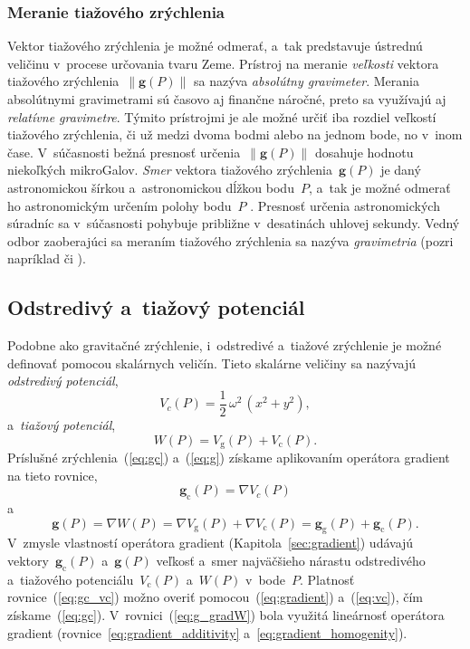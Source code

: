 \documentclass[a4paper, 12pt]{book}
\newcommand{\gidx}{\mathrm g}
\newcommand{\cidx}{\mathrm c}
\let\vec\mathbf
\begin{document}
\subsubsection{Meranie tiažového zrýchlenia}
\label{sec:gravity_measurements}

Vektor tiažového zrýchlenia je možné odmerať, a~tak predstavuje ústrednú 
veličinu v~procese určovania tvaru Zeme.  Prístroj na meranie \emph{veľkosti} 
vektora tiažového zrýchlenia~$\| \vec g(P) \|$ sa nazýva \emph{absolútny 
gravimeter}.  Merania absolútnymi gravimetrami sú časovo aj finančne náročné, 
preto sa využívajú aj \emph{relatívne gravimetre}.  Týmito prístrojmi je ale 
možné určiť iba rozdiel veľkostí tiažového zrýchlenia, či už medzi dvoma bodmi 
alebo na jednom bode, no v~inom čase.  V~súčasnosti bežná presnosť určenia~$\| 
\vec g(P) \|$ dosahuje hodnotu niekoľkých mikroGalov.  \emph{Smer} vektora 
tiažového zrýchlenia~$\vec g(P)$ je daný astronomickou šírkou a~astronomickou 
dĺžkou bodu~$P$, a~tak je možné odmerať ho astronomickým určením polohy 
bodu~$P$ \parencite{MoritzPhysicalGeodesy}.  Presnosť určenia astronomických 
súradníc sa v~súčasnosti pohybuje približne v~desatinách uhlovej sekundy.    
Vedný odbor zaoberajúci sa meraním tiažového zrýchlenia sa nazýva 
\emph{gravimetria} (pozri napríklad \cite{Torge1989,Rozimant1994} či 
\cite{Janak2010}).  






\subsection{Odstredivý a~tiažový potenciál}
\label{sec:centrifugal_and_gravity_potential}

Podobne ako gravitačné zrýchlenie, i~odstredivé a~tiažové zrýchlenie je
možné definovať pomocou skalárnych veličín.  Tieto skalárne veličiny sa
nazývajú \emph{odstredivý potenciál},
%
\begin{equation}
\label{eq:vc}
V_c(P) = \frac{1}{2} \, \omega^2 \, (x^2 + y^2){,}
\end{equation}
%
a~\emph{tiažový potenciál},
%
\begin{equation}
\label{eq:w}
W(P) = V_\gidx(P) + V_\cidx(P){.}
\end{equation}
%
Príslušné zrýchlenia~(\ref{eq:gc}) a~(\ref{eq:g}) získame aplikovaním operátora
gradient na tieto rovnice,
%
\begin{equation}
\label{eq:gc_vc}
\vec g_\cidx(P) = \nabla V_c(P)
\end{equation}
%
a
%
\begin{equation}
\label{eq:g_gradW}
\vec g(P) = \nabla W(P) = \nabla V_\gidx(P) + \nabla V_\cidx(P) = \vec
g_\gidx(P) + \vec g_\cidx(P){.}
\end{equation}
%
V~zmysle vlastností operátora gradient (Kapitola~\ref{sec:gradient}) udávajú 
vektory~$\vec g_\cidx(P)$ a~$\vec g(P)$ veľkosť a~smer najväčšieho nárastu
odstredivého a~tiažového potenciálu~$V_\cidx(P)$ a~$W(P)$ v~bode~$P$.  Platnosť
rovnice~(\ref{eq:gc_vc}) možno overiť pomocou~(\ref{eq:gradient})
a~(\ref{eq:vc}), čím získame~(\ref{eq:gc}).  V~rovnici~(\ref{eq:g_gradW}) bola
využitá lineárnosť operátora gradient (rovnice~\ref{eq:gradient_additivity} 
a~\ref{eq:gradient_homogenity}).
\end{document}
